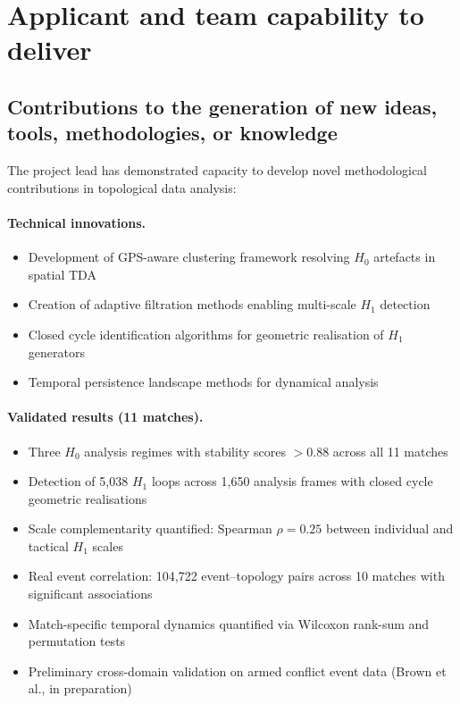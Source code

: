 \section{Applicant and team capability to deliver}

\subsection{Contributions to the generation of new ideas, tools, methodologies, or knowledge}

The project lead has demonstrated capacity to develop novel methodological contributions in topological data analysis:

\paragraph{Technical innovations.}
\begin{itemize}
  \item Development of GPS-aware clustering framework resolving $H_0$ artefacts in spatial TDA
  \item Creation of adaptive filtration methods enabling multi-scale $H_1$ detection
  \item Closed cycle identification algorithms for geometric realisation of $H_1$ generators
  \item Temporal persistence landscape methods for dynamical analysis
\end{itemize}

\paragraph{Validated results (11 matches).}
\begin{itemize}
  \item Three $H_0$ analysis regimes with stability scores ${>}0.88$ across all 11 matches
  \item Detection of 5{,}038 $H_1$ loops across 1{,}650 analysis frames with closed cycle geometric realisations
  \item Scale complementarity quantified: Spearman $\rho = 0.25$ between individual and tactical $H_1$ scales
  \item Real event correlation: 104{,}722 event--topology pairs across 10 matches with significant associations
  \item Match-specific temporal dynamics quantified via Wilcoxon rank-sum and permutation tests
  \item Preliminary cross-domain validation on armed conflict event data (Brown et al., in preparation)
\end{itemize}

